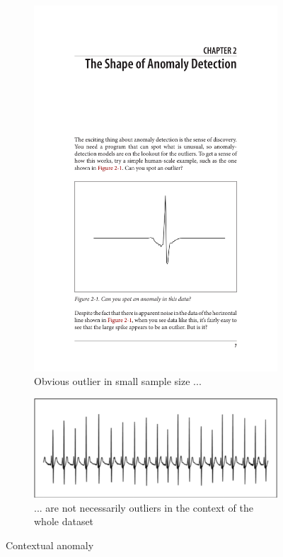 \documentclass{vldb}
\begin{document}
\begin{figure}
\begin{subfigure}{\linewidth}
	\centering
	\includegraphics[width=.8\linewidth]{"pics/ekg"}
	\caption{Obvious outlier in small sample size ...}
	\label{subfig:context-a}
\end{subfigure}
\begin{subfigure}{\linewidth}
  \centering
  \includegraphics[width=.8\linewidth]{"pics/ekg2"}
  \caption{... are not necessarily outliers in the context of the whole dataset}
  \label{subfig:context-b}
\end{subfigure}
\caption{Contextual anomaly}
\label{fig:contextual-anomaly}
\end{figure}
\end{document}
